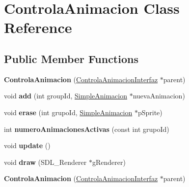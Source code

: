 \hypertarget{class_controla_animacion}{}\section{Controla\+Animacion Class Reference}
\label{class_controla_animacion}
\subsection*{Public Member Functions}
\begin{DoxyCompactItemize}
\item 
{\bfseries Controla\+Animacion} (\hyperlink{class_controla_animacion_interfaz}{Controla\+Animacion\+Interfaz} $\ast$parent)\hypertarget{class_controla_animacion_a56b71837722efe2627ff4f53839b992d}{}\label{class_controla_animacion_a56b71837722efe2627ff4f53839b992d}

\item 
void {\bfseries add} (int group\+Id, \hyperlink{class_simple_animacion}{Simple\+Animacion} $\ast$nueva\+Animacion)\hypertarget{class_controla_animacion_a83626ec71f363601ee1c268cd4b0630b}{}\label{class_controla_animacion_a83626ec71f363601ee1c268cd4b0630b}

\item 
void {\bfseries erase} (int grupo\+Id, \hyperlink{class_simple_animacion}{Simple\+Animacion} $\ast$p\+Sprite)\hypertarget{class_controla_animacion_a562efb1df59377cb7c451106ffe85f9b}{}\label{class_controla_animacion_a562efb1df59377cb7c451106ffe85f9b}

\item 
int {\bfseries numero\+Animaciones\+Activas} (const int grupo\+Id)\hypertarget{class_controla_animacion_a3fa11f8372987007fc7849f536693034}{}\label{class_controla_animacion_a3fa11f8372987007fc7849f536693034}

\item 
void {\bfseries update} ()\hypertarget{class_controla_animacion_a8b91ef884078facfc93ccc6aa7d24912}{}\label{class_controla_animacion_a8b91ef884078facfc93ccc6aa7d24912}

\item 
void {\bfseries draw} (S\+D\+L\+\_\+\+Renderer $\ast$g\+Renderer)\hypertarget{class_controla_animacion_ad7a57ea8853d42f4ca47b2e95525ebde}{}\label{class_controla_animacion_ad7a57ea8853d42f4ca47b2e95525ebde}

\item 
{\bfseries Controla\+Animacion} (\hyperlink{class_controla_animacion_interfaz}{Controla\+Animacion\+Interfaz} $\ast$parent)\hypertarget{class_controla_animacion_a56b71837722efe2627ff4f53839b992d}{}\label{class_controla_animacion_a56b71837722efe2627ff4f53839b992d}


\end{DoxyCompactItemize}

